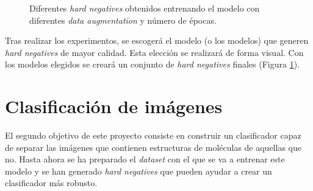 \begin{figure}[H]
\centering
    \caption{Diferentes \textit{hard negatives} obtenidos entrenando el modelo con diferentes \textit{data augmentation} y número de épocas.} 
    \label{fig:generate-hard-negatives}
\end{figure}
    
Tras realizar los experimentos, se escogerá el modelo (o los modelos) que generen \textit{hard negatives} de mayor calidad. Esta elección se realizará de forma visual. Con los modelos elegidos se creará un conjunto de \textit{hard negatives} finales (Figura \ref{fig:generate-hard-negatives}).

\newpage
\section{Clasificación de imágenes}
El segundo objetivo de este proyecto consiste en construir un clasificador capaz de separar las imágenes que contienen estructuras de moléculas de aquellas que no. Hasta ahora se ha preparado el \textit{dataset} con el que se va a entrenar este modelo y se han generado \textit{hard negatives} que pueden ayudar a crear un clasificador más robusto.


